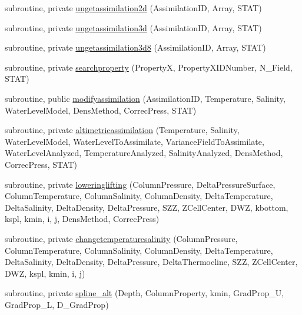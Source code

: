 \begin{DoxyCompactItemize}
\item 
subroutine, private \mbox{\hyperlink{namespacemoduleassimilation_a3a9adb0b25404594ea0591b684a7c40e}{ungetassimilation2d}} (Assimilation\+ID, Array, S\+T\+AT)
\item 
subroutine, private \mbox{\hyperlink{namespacemoduleassimilation_a73155621f7e95b5f4757f4efd48fee01}{ungetassimilation3d}} (Assimilation\+ID, Array, S\+T\+AT)
\item 
subroutine, private \mbox{\hyperlink{namespacemoduleassimilation_a06544a43532e67f29e5ac264d6870860}{ungetassimilation3d8}} (Assimilation\+ID, Array, S\+T\+AT)
\item 
subroutine, private \mbox{\hyperlink{namespacemoduleassimilation_a25c18cab5d2d7615f696e5f0ebfbada0}{searchproperty}} (PropertyX, Property\+X\+I\+D\+Number, N\+\_\+\+Field, S\+T\+AT)
\item 
subroutine, public \mbox{\hyperlink{namespacemoduleassimilation_a5932eaba41c6bd73ade2cb009b3824e8}{modifyassimilation}} (Assimilation\+ID, Temperature, Salinity, Water\+Level\+Model, Dens\+Method, Correc\+Press, S\+T\+AT)
\item 
subroutine, private \mbox{\hyperlink{namespacemoduleassimilation_af392c1f06d8b730776cfb5680aaf95cb}{altimetricassimilation}} (Temperature, Salinity, Water\+Level\+Model, Water\+Level\+To\+Assimilate, Variance\+Field\+To\+Assimilate, Water\+Level\+Analyzed, Temperature\+Analyzed, Salinity\+Analyzed, Dens\+Method, Correc\+Press, S\+T\+AT)
\item 
subroutine, private \mbox{\hyperlink{namespacemoduleassimilation_adb4698b9b7aa680222581e31452094dc}{loweringlifting}} (Column\+Pressure, Delta\+Pressure\+Surface, Column\+Temperature, Column\+Salinity, Column\+Density, Delta\+Temperature, Delta\+Salinity, Delta\+Density, Delta\+Pressure, S\+ZZ, Z\+Cell\+Center, D\+WZ, kbottom, kspl, kmin, i, j, Dens\+Method, Correc\+Press)
\item 
subroutine, private \mbox{\hyperlink{namespacemoduleassimilation_a689487c17f9fdb64311b351530c9244a}{changetemperaturesalinity}} (Column\+Pressure, Column\+Temperature, Column\+Salinity, Column\+Density, Delta\+Temperature, Delta\+Salinity, Delta\+Density, Delta\+Pressure, Delta\+Thermocline, S\+ZZ, Z\+Cell\+Center, D\+WZ, kspl, kmin, i, j)
\item 
subroutine, private \mbox{\hyperlink{namespacemoduleassimilation_a4473000cecbde1abb63d63fc9a6f5858}{spline\+\_\+alt}} (Depth, Column\+Property, kmin, Grad\+Prop\+\_\+U, Grad\+Prop\+\_\+L, D\+\_\+\+Grad\+Prop)
\item 

\end{DoxyCompactItemize}
